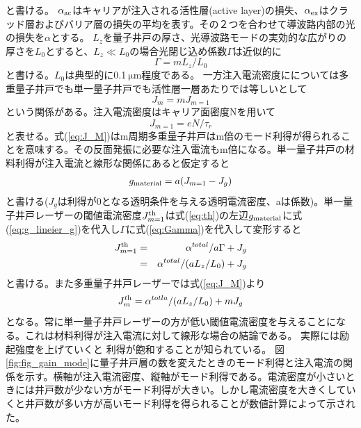 と書ける。
$\alpha_{\rm{ac}}$はキャリアが注入される活性層(active layer)の損失、$\alpha_{\rm{ex}}$はクラッド層およびバリア層の損失の平均を表す。その２つを合わせて導波路内部の光の損失を$\alpha$とする。
$L_{z}$を量子井戸の厚さ、光導波路モードの実効的な広がりの厚さを$L_{0}$とすると、$L_{z}\ll L_{0}$の場合光閉じ込め係数$\Gamma$は近似的に
\begin{equation}
\Gamma = mL_{z}/L_{0}
\label{eq:Gamma}
\end{equation}
と書ける。$L_{0}$は典型的に0.1$\ \si{\micro\metre}$程度である。
一方注入電流密度にについては多重量子井戸でも単一量子井戸でも活性層一層あたりでは等しいとして
\begin{equation}
J_{m}=mJ_{m=1}
\label{eq:J_M}
\end{equation}
という関係がある。注入電流密度はキャリア面密度Nを用いて
\begin{equation}
J_{m=1}=eN/\tau_{r}
\end{equation}
と表せる。式(\ref{eq:J_M})はm周期多重量子井戸はm倍のモード利得が得られることを意味する。その反面発振に必要な注入電流もm倍になる。単一量子井戸の材料利得が注入電流と線形な関係にあると仮定すると
\begin{eqnarray}
g_{\rm{material}}=a(J_{m=1}-J_{g})
\label{eq:g_lineier_g}
\end{eqnarray}
と書ける($J_{g}$は利得が0となる透明条件を与える透明電流密度、aは係数)。単一量子井戸レーザーの閾値電流密度$J^{\rm{th}}_{m=1}$は式(\ref{eq:th})の左辺$g_{\rm{material}}$に式(\ref{eq:g_lineier_g})を代入し$\Gamma$に式(\ref{eq:Gamma})を代入して変形すると
\begin{eqnarray}
J^{\rm{th}}_{m=1}&=&\alpha^{total}/ a\Gamma + J_{g}\nonumber\\
&=&\alpha^{total}/(aL_{z}/L_{0})+J_{g} 
\end{eqnarray}
と書ける。また多重量子井戸レーザーでは式(\ref{eq:J_M})より
\begin{equation}
J_{m}^{t\rm{h}}=\alpha^{totla}/(aL_{z}/L_{0}) + mJ_{g}
\label{eq:Mj0}
\end{equation}
となる。常に単一量子井戸レーザーの方が低い閾値電流密度を与えることになる。これは材料利得が注入電流に対して線形な場合の結論である。
実際には励起強度を上げていくと
利得が飽和することが知られている。
図\ref{fig:fig_gain_mode}に量子井戸層の数を変えたときのモード利得と注入電流の関係を示す\cite{y_arakawa}。横軸が注入電流密度、縦軸がモード利得である。電流密度が小さいときには井戸数が少ない方がモード利得が大きい。しかし電流密度を大きくしていくと井戸数が多い方が高いモード利得を得られることが数値計算によって示された。
